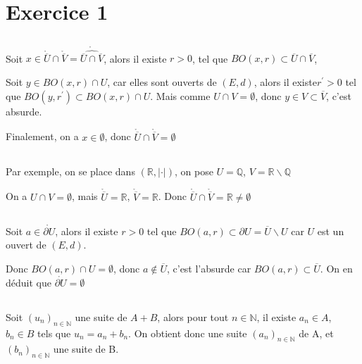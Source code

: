 \documentclass[a4paper,12pt]{book}
\begin{document}
\renewcommand{\labelitemi}{$\blacktriangleright$}
\renewcommand{\labelitemii}{$\bullet$}


\section{Exercice 1}
\subsection{}
Soit $x \in \mathring{\overline{U}} \cap \mathring{\overline{V}}=\mathring{\widehat{\overline{U} \cap \overline{V}}}$, alors il existe $ r>0$, tel que $BO(x,r) \subset \overline{U} \cap \overline{V}$, 

Soit $y \in BO(x,r) \cap U$, car elles sont ouverts de $(E,d)$, alors il existe$ r^{'} >0$ tel que $BO(y,r^{'}) \subset BO(x,r) \cap U$. 
Mais comme $U \cap V=\emptyset$, donc $y \in V \subset \overline{V}$, c'est absurde. 

Finalement, on a $x \in \emptyset$, donc $\boxed{\mathring{\overline{U}} \cap \mathring{\overline{V}}=\emptyset}$

\subsection{}
Par exemple, on se place dans $(\mathbb{R},\vert\cdot \vert)$, on pose $U=\mathbb{Q}$, $V=\mathbb{R}\backslash\mathbb{Q}$

On a $U \cap V=\emptyset$, mais $\mathring{\overline{U}}=\mathbb{R}$, $\mathring{\overline{V}}=\mathbb{R}$. Donc $\mathring{\overline{U}} \cap \mathring{\overline{V}}=\mathbb{R} \neq \emptyset$

\subsection{}
Soit $a \in \mathring{\partial U}$, alors il existe $r>0$ tel que $BO(a,r) \subset \partial U=\overline{U} \backslash U$ car $U$ est un ouvert de $(E,d)$. 

Donc $BO(a,r) \cap U=\emptyset$, donc $a \notin \overline{U}$, c'est l'absurde car $BO(a,r) \subset \overline{U}$. On en déduit que $\boxed{\mathring{\partial U}=\emptyset}$
\subsection{}

Soit $(u_n)_{n \in \mathbb{N}}$ une suite de $A+B$, alors pour tout $n \in \mathbb{N}$, il existe $a_n \in A$, $b_n \in B$ tels que 
$u_n=a_n+b_n$. On obtient donc une suite $(a_n)_{n \in \mathbb{N}}$ de A, et $(b_n)_{n \in \mathbb{N}}$ une suite de B. 
\end{document}
